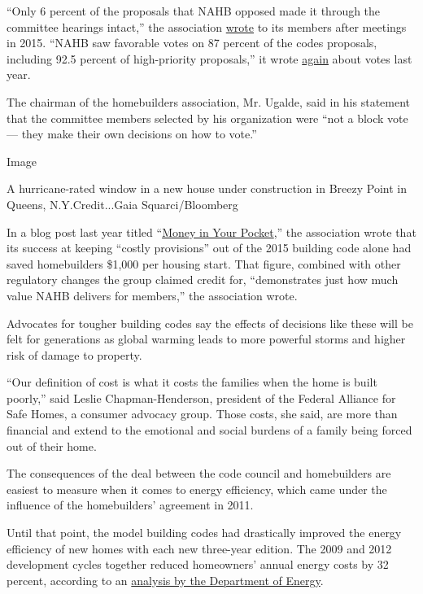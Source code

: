 ``Only 6 percent of the proposals that NAHB opposed made it through the
committee hearings intact,'' the association
\href{http://nahbnow.com/2015/05/nahb-continues-fight-for-better-codes/}{wrote}
to its members after meetings in 2015. ``NAHB saw favorable votes on 87
percent of the codes proposals, including 92.5 percent of high-priority
proposals,'' it wrote
\href{http://nahbnow.com/2019/09/building-codes-vote-coming-soon-and-nahb-members-can-help/}{again}
about votes last year.

The chairman of the homebuilders association, Mr. Ugalde, said in his
statement that the committee members selected by his organization were
``not a block vote --- they make their own decisions on how to vote.''

Image

A hurricane-rated window in a new house under construction in Breezy
Point in Queens, N.Y.Credit...Gaia Squarci/Bloomberg

In a blog post last year titled
``\href{http://nahbnow.com/2018/02/nahb-advocacy-money-in-your-pocket/}{Money
in Your Pocket},'' the association wrote that its success at keeping
``costly provisions'' out of the 2015 building code alone had saved
homebuilders \$1,000 per housing start. That figure, combined with other
regulatory changes the group claimed credit for, ``demonstrates just how
much value NAHB delivers for members,'' the association wrote.

Advocates for tougher building codes say the effects of decisions like
these will be felt for generations as global warming leads to more
powerful storms and higher risk of damage to property.

``Our definition of cost is what it costs the families when the home is
built poorly,'' said Leslie Chapman-Henderson, president of the Federal
Alliance for Safe Homes, a consumer advocacy group. Those costs, she
said, are more than financial and extend to the emotional and social
burdens of a family being forced out of their home.

The consequences of the deal between the code council and homebuilders
are easiest to measure when it comes to energy efficiency, which came
under the influence of the homebuilders' agreement in 2011.

Until that point, the model building codes had drastically improved the
energy efficiency of new homes with each new three-year edition. The
2009 and 2012 development cycles together reduced homeowners' annual
energy costs by 32 percent, according to an
\href{https://www.energycodes.gov/sites/default/files/documents/NationalResidentialCostEffectiveness.pdf}{analysis
by the Department of Energy}.


